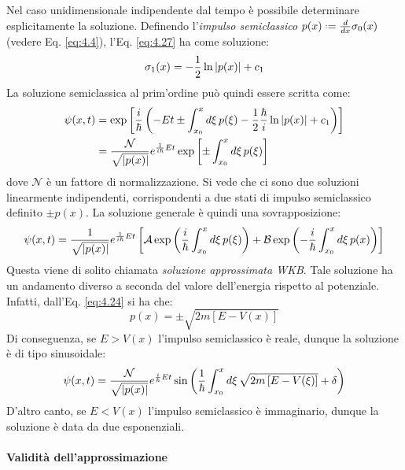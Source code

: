 Nel caso unidimensionale indipendente dal tempo è possibile determinare esplicitamente la soluzione. Definendo l'\textit{impulso semiclassico} $ p(x) \defeq \frac{d}{dx} \sigma_0(x) $ (vedere Eq. \ref{eq:4.4}), l'Eq. \ref{eq:4.27} ha come soluzione:
\begin{equation*}
	\sigma_1(x) = -\frac{1}{2} \ln \left\lvert p(x)\right\rvert + c_1
\end{equation*}
La soluzione semiclassica al prim'ordine può quindi essere scritta come:
\begin{equation*}
	\begin{split}
		\psi(x,t)
		&= \exp \left[ \frac{i}{\hbar} \left( -Et \pm \int_{x_0}^x d\xi\, p(\xi) - \frac{1}{2} \frac{\hbar}{i} \ln \left\lvert p(x)\right\rvert + c_1 \right) \right] \\
		&= \frac{\mathcal{N}}{\sqrt{\left\lvert p(x)\right\rvert}} e^{\frac{1}{i\hbar} Et} \exp \left[ \pm \int_{x_0}^x d\xi\, p(\xi) \right]
	\end{split}
\end{equation*}
dove $ \mathcal{N} $ è un fattore di normalizzazione. Si vede che ci sono due soluzioni linearmente indipendenti, corrispondenti a due stati di impulso semiclassico definito $ \pm p(x) $. La soluzione generale è quindi una sovrapposizione:
\begin{equation}
	\psi(x,t) = \frac{1}{\sqrt{\left\lvert p(x)\right\rvert}} e^{\frac{1}{i\hbar} Et} \left[ \mathcal{A} \exp \left( \frac{i}{\hbar} \int_{x_0}^x d\xi\, p(\xi) \right) + \mathcal{B} \exp \left( - \frac{i}{\hbar} \int_{x_0}^x d\xi\, p(x) \right) \right]
	\label{eq:4.29}
\end{equation}
Questa viene di solito chiamata \textit{soluzione approssimata WKB}.
Tale soluzione ha un andamento diverso a seconda del valore dell'energia rispetto al potenziale. Infatti, dall'Eq. \ref{eq:4.24} si ha che:
\begin{equation*}
	p(x) = \pm \sqrt{2m \left[ E - V(x) \right]}
\end{equation*}
Di conseguenza, se $ E > V(x) $ l'impulso semiclassico è reale, dunque la soluzione è di tipo sinusoidale:
\begin{equation*}
	\psi(x,t) = \frac{\mathcal{N}}{\sqrt{\left\lvert p(x)\right\rvert}} e^{\frac{i}{\hbar} Et} \sin \left( \frac{1}{\hbar} \int_{x_0}^x d\xi\, \sqrt{2m \left[ E - V(\xi) \right]} + \delta \right)
\end{equation*}
D'altro canto, se $ E < V(x) $ l'impulso semiclassico è immaginario, dunque la soluzione è data da due esponenziali.

\paragraph{Validità dell'approssimazione}

